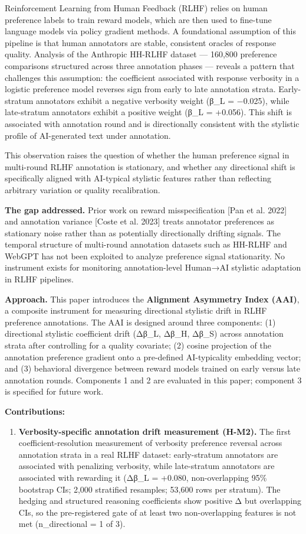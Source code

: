 
Reinforcement Learning from Human Feedback (RLHF) relies on human preference labels to train reward models, which are then used to fine-tune language models via policy gradient methods. A foundational assumption of this pipeline is that human annotators are stable, consistent oracles of response quality. Analysis of the Anthropic HH-RLHF dataset — 160,800 preference comparisons structured across three annotation phases — reveals a pattern that challenges this assumption: the coefficient associated with response verbosity in a logistic preference model reverses sign from early to late annotation strata. Early-stratum annotators exhibit a negative verbosity weight (β_L = −0.025), while late-stratum annotators exhibit a positive weight (β_L = +0.056). This shift is associated with annotation round and is directionally consistent with the stylistic profile of AI-generated text under annotation.

This observation raises the question of whether the human preference signal in multi-round RLHF annotation is stationary, and whether any directional shift is specifically aligned with AI-typical stylistic features rather than reflecting arbitrary variation or quality recalibration.

\textbf{The gap addressed.} Prior work on reward misspecification [Pan et al. 2022] and annotation variance [Coste et al. 2023] treats annotator preferences as stationary noise rather than as potentially directionally drifting signals. The temporal structure of multi-round annotation datasets such as HH-RLHF and WebGPT has not been exploited to analyze preference signal stationarity. No instrument exists for monitoring annotation-level Human→AI stylistic adaptation in RLHF pipelines.

\textbf{Approach.} This paper introduces the \textbf{Alignment Asymmetry Index (AAI)}, a composite instrument for measuring directional stylistic drift in RLHF preference annotations. The AAI is designed around three components: (1) directional stylistic coefficient drift (Δβ_L, Δβ_H, Δβ_S) across annotation strata after controlling for a quality covariate; (2) cosine projection of the annotation preference gradient onto a pre-defined AI-typicality embedding vector; and (3) behavioral divergence between reward models trained on early versus late annotation rounds. Components 1 and 2 are evaluated in this paper; component 3 is specified for future work.

\textbf{Contributions:}

\begin{enumerate}
\item \textbf{Verbosity-specific annotation drift measurement (H-M2).} The first coefficient-resolution measurement of verbosity preference reversal across annotation strata in a real RLHF dataset: early-stratum annotators are associated with penalizing verbosity, while late-stratum annotators are associated with rewarding it (Δβ_L = +0.080, non-overlapping 95\% bootstrap CIs; 2,000 stratified resamples; 53,600 rows per stratum). The hedging and structured reasoning coefficients show positive Δ but overlapping CIs, so the pre-registered gate of at least two non-overlapping features is not met (n_directional = 1 of 3).
\end{enumerate}


